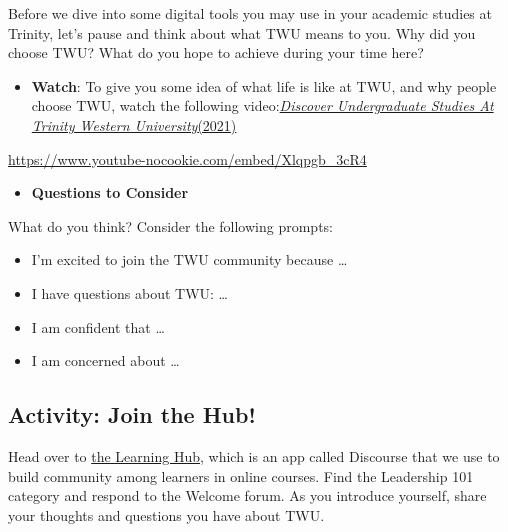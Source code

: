 \documentclass[
  letterpaper,
  DIV=11,
  numbers=noendperiod]{scrreprt}
\providecommand{\tightlist}{%
  \setlength{\itemsep}{0pt}\setlength{\parskip}{0pt}}\usepackage{longtable,booktabs,array}
\begin{document}
\begin{tcolorbox}[enhanced jigsaw, toprule=.15mm, colback=white, colframe=quarto-callout-note-color-frame, bottomtitle=1mm, leftrule=.75mm, coltitle=black, titlerule=0mm, rightrule=.15mm, colbacktitle=quarto-callout-note-color!10!white, left=2mm, title={Learning Activity}, opacitybacktitle=0.6, opacityback=0, breakable, toptitle=1mm, arc=.35mm, bottomrule=.15mm]

Before we dive into some digital tools you may use in your academic
studies at Trinity, let's pause and think about what TWU means to you.
Why did you choose TWU? What do you hope to achieve during your time
here?

\begin{itemize}
\tightlist
\item
  \textbf{Watch}: To give you some idea of what life is like at TWU, and
  why people choose TWU, watch the following
  video:\href{https://www.youtube.com/watch?v=Xlqpgb_3cR4}{\emph{Discover
  Undergraduate Studies At Trinity Western University}(2021)}
\end{itemize}

\url{https://www.youtube-nocookie.com/embed/Xlqpgb_3cR4}

\begin{itemize}
\tightlist
\item
  \textbf{Questions to Consider}
\end{itemize}

What do you think? Consider the following prompts:

\begin{itemize}
\tightlist
\item
  I'm excited to join the TWU community because \ldots{}
\item
  I have questions about TWU: \ldots{}
\item
  I am confident that \ldots{}
\item
  I am concerned about \ldots{}
\end{itemize}

\end{tcolorbox}

\subsection{Activity: Join the Hub!}\label{activity-join-the-hub}

\begin{tcolorbox}[enhanced jigsaw, toprule=.15mm, colback=white, colframe=quarto-callout-note-color-frame, bottomtitle=1mm, leftrule=.75mm, coltitle=black, titlerule=0mm, rightrule=.15mm, colbacktitle=quarto-callout-note-color!10!white, left=2mm, title={Learning Activity}, opacitybacktitle=0.6, opacityback=0, breakable, toptitle=1mm, arc=.35mm, bottomrule=.15mm]

Head over to
\href{https://twu.discourse.group/auth/microsoft_office365}{the Learning
Hub}, which is an app called Discourse that we use to build community
among learners in online courses. Find the Leadership 101 category and
respond to the Welcome forum. As you introduce yourself, share your
thoughts and questions you have about TWU.

\end{tcolorbox}
\end{document}
